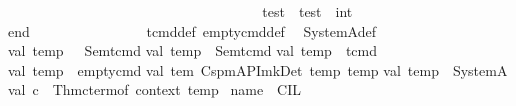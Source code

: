 \begin{isabellebody}
\ \ \ \ \ \ \ \ \ \ \ \ \ \isanewline
\ \ \ \ \ \ \ \ \ \ \isanewline
\ \ \ \ \ \ \ \ \ \ \ \ test\ {\isacharequal}{\kern0pt}\ {\isacartoucheopen}test{\isacharplus}{\kern0pt}{}\ {\isacharcolon}{\kern0pt}{\isacharcolon}{\kern0pt}\ int{\isacartoucheclose}{\isacharsemicolon}{\kern0pt}\isanewline
\ \ \ \ \ \ \ \ \ \ \isanewline
end{\isacharsemicolon}{\kern0pt}\ \ \ \ \ \ \ \ \ \ \ \ \ \ \ \isanewline
\isanewline
{}\isamarkupfalse%
\ t{}{\isacharunderscore}{\kern0pt}cmd{\isacharunderscore}{\kern0pt}def\ empty{}{\isacharunderscore}{\kern0pt}cmd{\isacharunderscore}{\kern0pt}def\ \isanewline
{}\isamarkupfalse%
\ System{\isacharunderscore}{\kern0pt}A{\isacharunderscore}{\kern0pt}def\isanewline
%
\isadelimML
\isanewline
%
\endisadelimML
%
\isatagML
{}\isamarkupfalse%
{\isacartoucheopen}\isanewline
val\ temp\ \ {\isacharequal}{\kern0pt}\ \isactrlterm {\isasymopen}Sem{\isacharparenleft}{\kern0pt}t{}{\isacharunderscore}{\kern0pt}cmd{\isacharparenright}{\kern0pt}{\isasymclose}\isanewline
val\ temp{}\ {\isacharequal}{\kern0pt}\ \isactrlterm {\isasymopen}Sem{\isacharparenleft}{\kern0pt}t{}{\isacharunderscore}{\kern0pt}cmd{\isacharparenright}{\kern0pt}{\isasymclose}\isanewline
val\ temp{}\ {\isacharequal}{\kern0pt}\ \isactrlterm {\isasymopen}{\isacharparenleft}{\kern0pt}t{}{\isacharunderscore}{\kern0pt}cmd{\isacharparenright}{\kern0pt}{\isasymclose}\ \ \ \ \ \ \ \ \ \isanewline
val\ temp{}\ {\isacharequal}{\kern0pt}\ \isactrlterm {\isasymopen}empty{}{\isacharunderscore}{\kern0pt}cmd{\isasymclose}\isanewline
\isanewline
val\ tem{}{\isacharequal}{\kern0pt}\ Cspm{\isacharunderscore}{\kern0pt}API{\isachardot}{\kern0pt}mk{\isacharunderscore}{\kern0pt}Det\ temp\ temp{}\isanewline
{\isacartoucheclose}\isanewline
\isanewline
{}\isamarkupfalse%
{\isacartoucheopen}\isanewline
val\ temp\ {\isacharequal}{\kern0pt}\ \isactrlterm {\isasymopen}System{\isacharunderscore}{\kern0pt}A{\isasymclose}\isanewline
\isanewline
val\ c\ {\isacharequal}{\kern0pt}\ Thm{\isachardot}{\kern0pt}cterm{\isacharunderscore}{\kern0pt}of\ {\isacharat}{\kern0pt}{\isacharbraceleft}{\kern0pt}context{\isacharbraceright}{\kern0pt}\ temp\isanewline
\isanewline
{\isacartoucheclose}%
\endisatagML
{\isafoldML}%
%
\isadelimML
\isanewline
%
\endisadelimML
\isanewline
{}\isamarkupfalse%
\ {\isacharparenleft}{\kern0pt}{}{}{}{\isacharparenright}{\kern0pt}name\ {\isacharcolon}{\kern0pt}\ {\isachardoublequoteopen}CIL{\isachardoublequoteclose}\isanewline

\end{isabellebody}
